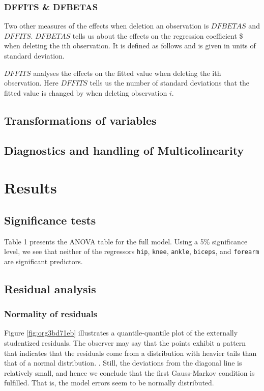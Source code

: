 \documentclass[11pt]{article}
\begin{document}
\subsubsection{DFFITS \& DFBETAS}
\label{sec:org0df96ad}

Two other measures of the effects when deletion an observation is \(DFBETAS\) and \(DFFITS\). \(DFBETAS\) tells us
about the effects on the regression coefficient \$ when deleting the ith observation. It is defined as
follows and is given in units of standard deviation.

\(DFFITS\) analyses the effects on the fitted value when deleting the ith observation. Here \(DFFITS\) tells us
the number of standard deviations that the fitted value is changed by when deleting observation \(i\).

\subsection{Transformations of variables}
\label{sec:orgca32727}
\subsection{Diagnostics and handling of Multicolinearity}
\label{sec:orga0dd3a6}
\newpage
\section{Results}
\label{sec:org183cc41}
\subsection{Significance tests}
\label{sec:org3b74e41}

Table 1 presents the ANOVA table for the full model. Using a 5\% significance level, we see that neither of 
the regressors \texttt{hip}, \texttt{knee}, \texttt{ankle}, \texttt{biceps}, and \texttt{forearm} are 
significant predictors. 



\subsection{Residual analysis}
\label{sec:org62f2329}
\subsubsection{Normality of residuals}
\label{sec:org74936a3}

Figure \ref{fig:org3bd71eb} illustrates a quantile-quantile plot of the externally studentized residuals.
The observer may say that the  points exhibit a pattern that indicates that the residuals come from
a distribution with heavier tails than that of a normal distribution. 
\cite{Montgomery2012}. Still, the deviations from the diagonal line is relatively small, and hence
we conclude that the first Gauss-Markov condition is fulfilled. That is, the model errors seem to be 
normally distributed.
\end{document}
